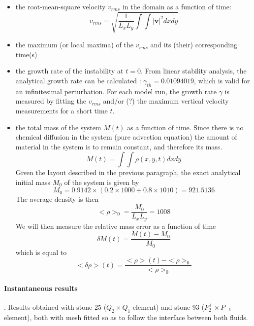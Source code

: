 \begin{itemize}

\item the root-mean-square velocity $v_{rms}$ in the domain as a function of time:
\begin{equation}
v_{rms}= \sqrt{ \frac{1}{L_xL_y} \int \int |{\bm v}|^2 dxdy}
\end{equation}

\item the maximum (or local maxima) of the $v_{rms}$ and its (their) corresponding time(s)

\item the growth rate of the instability at $t=0$.
From linear stability analysis, the analytical growth rate can be calculated \cite{ramb68,ramb81}: 
$\gamma_{th}=0.01094019$, which is valid for an infinitesimal perturbation. 
For each model run, the growth rate $\gamma$ is measured by fitting the $v_{rms}$ and/or (?) the maximum 
vertical velocity measurements for a short time $t$. 

\item the total mass of the system $M(t)$ as a function of time. Since there is no chemical diffusion in the 
system (pure advection equation) the amount of material in the system is to remain constant, and 
therefore its mass.
\begin{equation}
M(t) = \int \int \rho(x,y,t) dxdy
\end{equation}
Given the layout described in the previous paragraph, the exact analytical initial mass $M_0$ of the system 
is given by 
\[
M_0=0.9142 \times (0.2 \times 1000 + 0.8\times 1010) = 921.5136
\]
The average density is then 
\[
<\rho>_0=\frac{M_0}{L_xL_y} = 1008
\]
We will then measure the relative mass error as a function of time
\[
\delta M(t) = \frac{M(t)-M_0}{M_0}
\]
which is equal to 
\[
<\delta\rho>(t) = \frac{<\rho>(t)-<\rho>_0}{<\rho>_0}
\]

\end{itemize}




\paragraph{Instantaneous results}.
Results obtained with stone 25 ($Q_2\times Q_1$ element) 
and stone 93 ($P_2^+\times P_{-1}$ element), 
both with mesh fitted so as to follow the interface between both fluids.


